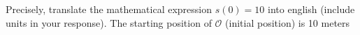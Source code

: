 {Precisely, translate the mathematical expression $s(0)=10$ into english (include units in your response).}
{The starting position of $\mathcal{O}$ (initial position) is 10 meters}